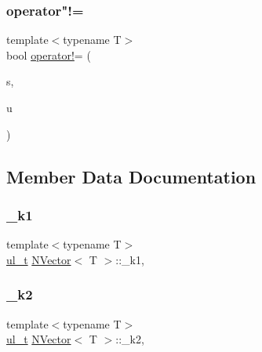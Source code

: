 \mbox{\label{class_n_vector_ad51fab9cb11a2faf828455d676ee6755}} 
\subsubsection{\texorpdfstring{operator"!=}{operator!=}\hspace{0.1cm}{\footnotesize\ttfamily [3/3]}}
{\footnotesize\ttfamily template$<$typename T$>$ \\
bool \mbox{\hyperlink{class_n_vector_a697b7e9e059d8045dc5f682f94521548}{operator!}}= (\begin{DoxyParamCaption}\item[{T}]{s,  }\item[{const \mbox{\hyperlink{class_n_vector}{N\+Vector}}$<$ T $>$ \&}]{u }\end{DoxyParamCaption})\hspace{0.3cm}{\ttfamily [friend]}}



\subsection{Member Data Documentation}
\mbox{\label{class_n_vector_a355ee9ef9436669e52d0ff4538f85e27}} 
\subsubsection{\texorpdfstring{\_k1}{\_k1}}
{\footnotesize\ttfamily template$<$typename T$>$ \\
\mbox{\hyperlink{group___n_algebra_ga1b140a2034db3f5dfe18a987745df43a}{ul\+\_\+t}} \mbox{\hyperlink{class_n_vector}{N\+Vector}}$<$ T $>$\+::\+\_\+k1\hspace{0.3cm}{\ttfamily [mutable]}, {\ttfamily [protected]}}

\mbox{\label{class_n_vector_a6591512e0566996c42f3d74c8174385e}} 
\subsubsection{\texorpdfstring{\_k2}{\_k2}}
{\footnotesize\ttfamily template$<$typename T$>$ \\
\mbox{\hyperlink{group___n_algebra_ga1b140a2034db3f5dfe18a987745df43a}{ul\+\_\+t}} \mbox{\hyperlink{class_n_vector}{N\+Vector}}$<$ T $>$\+::\+\_\+k2\hspace{0.3cm}{\ttfamily [mutable]}, {\ttfamily [protected]}}



